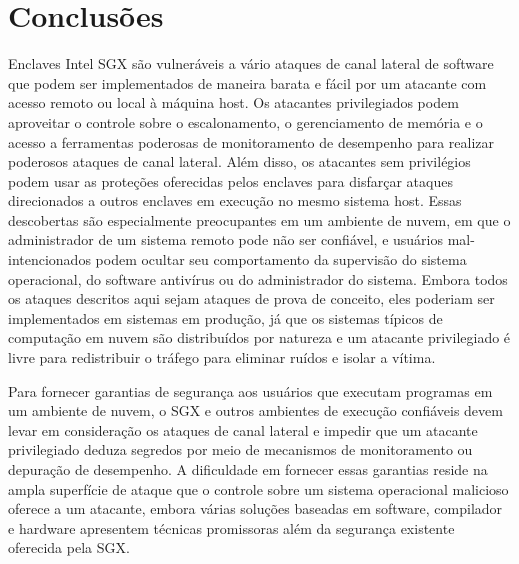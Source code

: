 \documentclass[review]{elsarticle}
\begin{document}
\section{Conclusões}

Enclaves Intel SGX são vulneráveis a vário ataques de canal lateral de software que podem ser implementados de maneira barata e fácil por um atacante com acesso remoto ou local à máquina host. Os atacantes privilegiados podem aproveitar o controle sobre o escalonamento, o gerenciamento de memória e o acesso a ferramentas poderosas de monitoramento de desempenho para realizar poderosos ataques de canal lateral. Além disso, os atacantes sem privilégios podem usar as proteções oferecidas pelos enclaves para disfarçar ataques direcionados a outros enclaves em execução no mesmo sistema host. Essas descobertas são especialmente preocupantes em um ambiente de nuvem, em que o administrador de um sistema remoto pode não ser confiável, e usuários mal-intencionados podem ocultar seu comportamento da supervisão do sistema operacional, do software antivírus ou do administrador do sistema. Embora todos os ataques descritos aqui sejam ataques de prova de conceito, eles poderiam ser implementados em sistemas em produção, já que os sistemas típicos de computação em nuvem são distribuídos por natureza e um atacante privilegiado é livre para redistribuir o tráfego para eliminar ruídos e isolar a vítima.

Para fornecer garantias de segurança aos usuários que executam programas em um ambiente de nuvem, o SGX e outros ambientes de execução confiáveis devem levar em consideração os ataques de canal lateral e impedir que um atacante privilegiado deduza segredos por meio de mecanismos de monitoramento ou depuração de desempenho. A dificuldade em fornecer essas garantias reside na ampla superfície de ataque que o controle sobre um sistema operacional malicioso oferece a um atacante, embora várias soluções baseadas em software, compilador e hardware apresentem técnicas promissoras além da segurança existente oferecida pela SGX.


\end{document}
